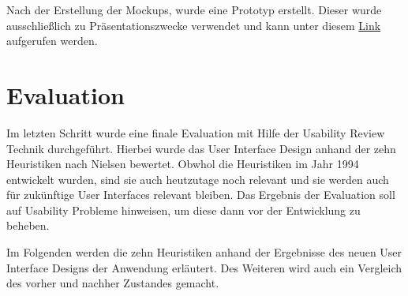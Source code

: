 Nach der Erstellung der Mockups, wurde eine Prototyp erstellt.
Dieser wurde ausschließlich zu Präsentationszwecke verwendet und kann unter diesem \href{https://figma.fun/71cjZX}{Link} aufgerufen werden.

\section{Evaluation}

Im letzten Schritt wurde eine finale Evaluation mit Hilfe der Usability Review Technik durchgeführt.
Hierbei wurde das User Interface Design anhand der zehn Heuristiken nach Nielsen bewertet.
Obwhol die Heuristiken im Jahr 1994 entwickelt wurden, sind sie auch heutzutage noch relevant und sie werden auch für zukünftige User Interfaces relevant bleiben. \citep[vgl.]{jakob_2020}
Das Ergebnis der Evaluation soll auf Usability Probleme hinweisen, um diese dann vor der Entwicklung zu beheben.

Im Folgenden werden die zehn Heuristiken anhand der Ergebnisse des neuen User Interface Designs der Anwendung erläutert.
Des Weiteren wird auch ein Vergleich des vorher und nachher Zustandes gemacht.

